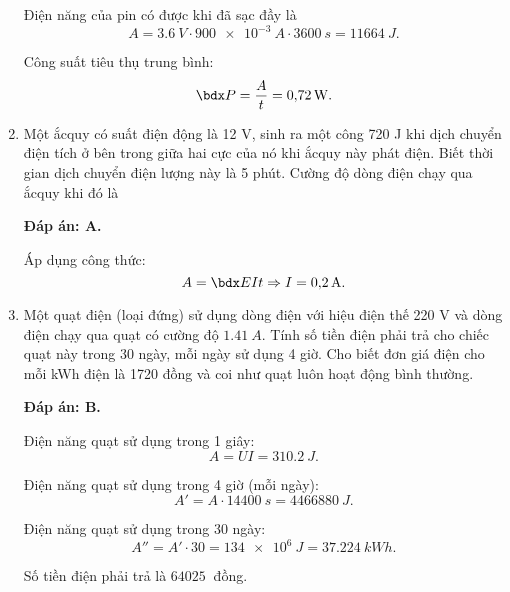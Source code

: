 \begin{enumerate}[label=\bfseries Câu \arabic*:]
{		Điện năng của pin có được khi đã sạc đầy là
		$$A = \SI{3.6}{V} \cdot \SI{900e-3}{A} \cdot \SI{3600}{s} = \SI{11664}{J}.$$
		
		Công suất tiêu thụ trung bình:
		$$\calP = \dfrac{A}{t} = \SI{0.72}{W}.$$
	}
	\item {}
	
	\cauhoi
	{Một ắcquy có suất điện động là 12 V, sinh ra một công 720 J khi dịch chuyển điện tích ở bên trong giữa hai cực của nó khi ắcquy này phát điện. Biết thời gian dịch chuyển điện lượng này là 5 phút. Cường độ dòng điện chạy qua ắcquy khi đó là
		
	}
	\loigiai
	{	\textbf{Đáp án: A.}
		
		Áp dụng công thức:
		$$A=\calE I t \Rightarrow I = \SI{0.2}{A}.$$
	}
	\item {}
	
	\cauhoi
	{Một quạt điện (loại đứng) sử dụng dòng điện với hiệu điện thế 220 V và dòng điện chạy qua quạt có cường độ $\SI{1.41}{A}$. Tính số tiền điện phải trả cho chiếc quạt này trong 30 ngày, mỗi ngày sử dụng 4 giờ. Cho biết đơn giá điện cho mỗi kWh điện là 1720 đồng và coi như quạt luôn hoạt động bình thường.
		
	}
	\loigiai
	{	\textbf{Đáp án: B.}
		
		Điện năng quạt sử dụng trong 1 giây:
		$$A=UI = \SI{310.2}{J}.$$
		
		Điện năng quạt sử dụng trong 4 giờ (mỗi ngày):
		$$A'=A \cdot \SI{14400}{s} = \SI{4466880}{J}.$$
		
		Điện năng quạt sử dụng trong 30 ngày:
		$$A'' = A' \cdot 30 = \SI{134e6}{J} = \SI{37.224}{kWh}.$$
		
		Số tiền điện phải trả là $\SI{64025}{}$ đồng.
	}
\end{enumerate}

\whiteBGstarEnd

